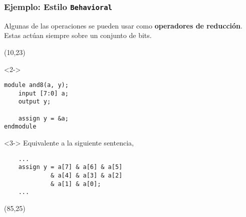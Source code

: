 \documentclass[aspectratio=169]{beamer}
\begin{document}
\begin{frame}[fragile,t]
    \frametitle{Ejemplo: Estilo \texttt{Behavioral}}
    Algunas de las operaciones se pueden usar como \textbf{operadores de reducción}.\\
    Estas actúan siempre sobre un conjunto de bits.
    \begin{textblock}{70}(10,23)
    \begin{onlyenv}<2->
\begin{lstlisting}
module and8(a, y);
    input [7:0] a;
    output y;

    assign y = &a;    
endmodule
\end{lstlisting}
    \end{onlyenv}
    \begin{onlyenv}<3->
    Equivalente a la siguiente sentencia,
\begin{lstlisting}
    ...
    assign y = a[7] & a[6] & a[5]
             & a[4] & a[3] & a[2]
             & a[1] & a[0];
    ...    
\end{lstlisting}
    \end{onlyenv}
    \end{textblock}
    \begin{textblock}{60}(85,25)
    \end{textblock}
\end{frame}
\end{document}

